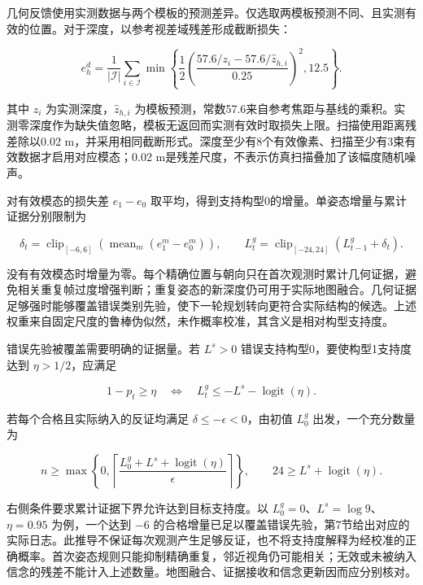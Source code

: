 \documentclass[11pt,a4paper]{article}
\numberwithin{equation}{section}
\begin{document}
几何反馈使用实测数据与两个模板的预测差异。仅选取两模板预测不同、且实测有效的位置。对于深度，以参考视差域残差形成截断损失：

\begin{equation}
e_h^d=\frac{1}{|\mathcal I|}\sum_{i\in\mathcal I}
\min\left\{\frac12
\left(\frac{57.6/z_i-57.6/\widehat z_{h,i}}{0.25}\right)^2,
12.5\right\}.
\end{equation}

其中 \(z_i\) 为实测深度，\(\widehat z_{h,i}\) 为模板预测，常数57.6来自参考焦距与基线的乘积。实测零深度作为缺失值忽略，模板无返回而实测有效时取损失上限。扫描使用距离残差除以0.02 m，并采用相同截断形式。深度至少有8个有效像素、扫描至少有3束有效数据才启用对应模态；0.02 m是残差尺度，不表示仿真扫描叠加了该幅度随机噪声。

对有效模态的损失差 \(e_1-e_0\) 取平均，得到支持构型0的增量。单姿态增量与累计证据分别限制为

\begin{equation}
\delta_t=\operatorname{clip}_{[-6,6]}
\left(\operatorname{mean}_{m}(e_1^m-e_0^m)\right),
\qquad
L_t^g=\operatorname{clip}_{[-24,24]}(L_{t-1}^g+\delta_t).
\end{equation}

没有有效模态时增量为零。每个精确位置与朝向只在首次观测时累计几何证据，避免相关重复帧过度增强判断；重复姿态的新深度仍可用于实际地图融合。几何证据足够强时能够覆盖错误类别先验，使下一轮规划转向更符合实际结构的候选。上述权重来自固定尺度的鲁棒伪似然，未作概率校准，其含义是相对构型支持度。

错误先验被覆盖需要明确的证据量。若 \(L^s>0\) 错误支持构型0，要使构型1支持度达到 \(\eta>1/2\)，应满足

\begin{equation}
1-p_t\ge\eta
\quad\Longleftrightarrow\quad
L_t^g\le-L^s-\operatorname{logit}(\eta).
\end{equation}

若每个合格且实际纳入的反证均满足 \(\delta\le-\epsilon<0\)，由初值 \(L_0^g\) 出发，一个充分数量为

\begin{equation}
n\ge\max\left\{0,
\left\lceil\frac{L_0^g+L^s+\operatorname{logit}(\eta)}{\epsilon}\right\rceil
\right\},
\qquad 24\ge L^s+\operatorname{logit}(\eta).
\end{equation}

右侧条件要求累计证据下界允许达到目标支持度。以 \(L_0^g=0\)、\(L^s=\log9\)、\(\eta=0.95\) 为例，一个达到 \(-6\) 的合格增量已足以覆盖错误先验，第7节给出对应的实际日志。此推导不保证每次观测产生足够反证，也不将支持度解释为经校准的正确概率。首次姿态规则只能抑制精确重复，邻近视角仍可能相关；无效或未被纳入信念的残差不能计入上述数量。地图融合、证据接收和信念更新因而应分别核对。
\end{document}
